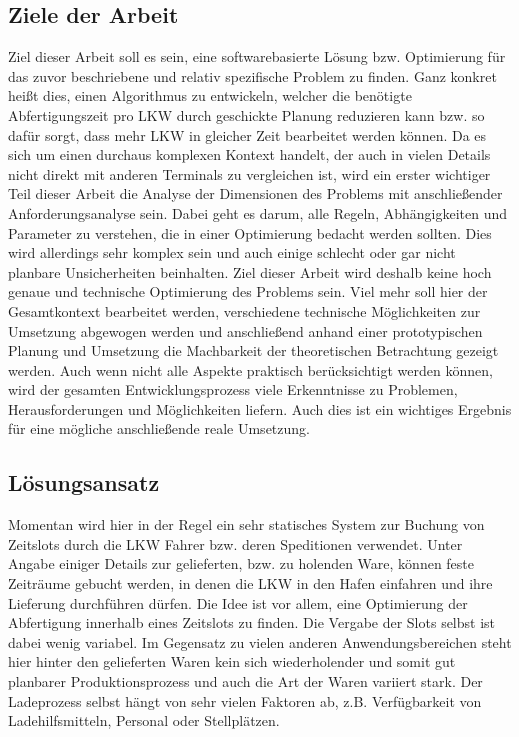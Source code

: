 \subsection{Ziele der Arbeit}

Ziel dieser Arbeit soll es sein, eine softwarebasierte Lösung bzw. Optimierung für das zuvor beschriebene und relativ spezifische Problem zu finden. Ganz konkret heißt dies, einen Algorithmus zu entwickeln, welcher die benötigte Abfertigungszeit pro LKW durch geschickte Planung reduzieren kann bzw. so dafür sorgt, dass mehr LKW in gleicher Zeit bearbeitet werden können. Da es sich um einen durchaus komplexen Kontext handelt, der auch in vielen Details nicht direkt mit anderen Terminals zu vergleichen ist, wird ein erster wichtiger Teil dieser Arbeit die Analyse der Dimensionen des Problems mit anschließender Anforderungsanalyse sein. Dabei geht es darum, alle Regeln, Abhängigkeiten und Parameter zu verstehen, die in einer Optimierung bedacht werden sollten. Dies wird allerdings sehr komplex sein und auch einige schlecht oder gar nicht planbare Unsicherheiten beinhalten. Ziel dieser Arbeit wird deshalb keine hoch genaue und technische Optimierung des Problems sein. Viel mehr soll hier der Gesamtkontext bearbeitet werden, verschiedene technische Möglichkeiten zur Umsetzung abgewogen werden und anschließend anhand einer prototypischen Planung und Umsetzung die Machbarkeit der theoretischen Betrachtung gezeigt werden. Auch wenn nicht alle Aspekte praktisch berücksichtigt werden können, wird der gesamten Entwicklungsprozess viele Erkenntnisse zu Problemen, Herausforderungen und Möglichkeiten liefern. Auch dies ist ein wichtiges Ergebnis für eine mögliche anschließende reale Umsetzung.

\subsection{Lösungsansatz}

Momentan wird hier in der Regel ein sehr statisches System zur Buchung von Zeitslots durch die LKW Fahrer bzw. deren Speditionen verwendet. Unter Angabe einiger Details zur gelieferten, bzw. zu holenden Ware, können feste Zeiträume gebucht werden, in denen die LKW in den Hafen einfahren und ihre Lieferung durchführen dürfen. Die Idee ist vor allem, eine Optimierung der Abfertigung innerhalb eines Zeitslots zu finden. Die Vergabe der Slots selbst ist dabei wenig variabel. Im Gegensatz zu vielen anderen Anwendungsbereichen steht hier hinter den gelieferten Waren kein sich wiederholender und somit gut planbarer Produktionsprozess und auch die Art der Waren variiert stark. Der Ladeprozess selbst hängt von sehr vielen Faktoren ab, z.B. Verfügbarkeit von Ladehilfsmitteln, Personal oder Stellplätzen. 

